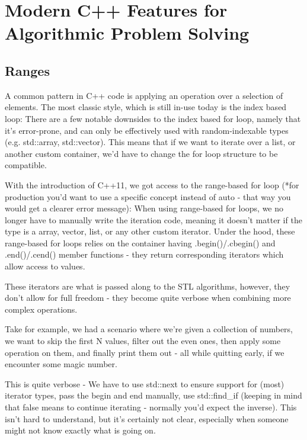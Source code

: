 \documentclass[
    english, %
]{VUMIFPSkursinis}
\begin{document}
\section{Modern C++ Features for Algorithmic Problem Solving}

\subsection{Ranges}

A common pattern in C++ code is applying an operation over a selection of elements. The most classic style, which is still in-use today is the index based loop:
There are a few notable downsides to the index based for loop, namely that it's error-prone, and can only be effectively used with random-indexable types (e.g. std::array, std::vector).
This means that if we want to iterate over a list, or another custom container, we'd have to change the for loop structure to be compatible.

With the introduction of C++11, we got access to the range-based for loop (*for production you'd want to use a specific concept instead of auto - that way you would get a clearer error message):
When using range-based for loops, we no longer have to manually write the iteration code, meaning it doesn't matter if the type is a array, vector, list, or any other custom iterator.
Under the hood, these range-based for loops relies on the container having .begin()/.cbegin() and .end()/.cend() member functions - they return corresponding iterators which allow access to values.

These iterators are what is passed along to the STL\* algorithms, however, they don't allow for full freedom - they become quite verbose when combining more complex operations.

Take for example, we had a scenario where we're given a collection of numbers, we want to skip the first N values, filter out the even ones, then apply some operation on them, and finally print them out - all while quitting early, if we encounter some magic number.


This is quite verbose - We have to use std::next to ensure support for (most) iterator types, pass the begin and end manually, use std::find\_if (keeping in mind that false means to continue iterating - normally you'd expect the inverse). This isn't hard to understand, but it's certainly not clear, especially when someone might not know exactly what is going on.
\end{document}
